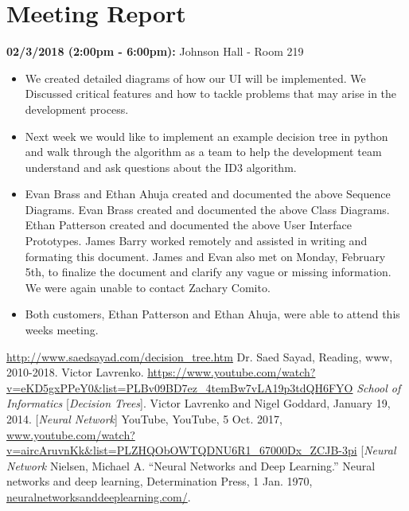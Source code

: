 \documentclass[a4paper]{article}
\begin{document}
\section{Meeting Report}
\textbf{02/3/2018 (2:00pm - 6:00pm):} Johnson Hall - Room 219
\begin{itemize}
\item We created detailed diagrams of how our UI will be implemented. We Discussed critical features and how to tackle problems that may arise in the development process.
\item Next week we would like to implement an example decision tree in python and walk through the algorithm as a team to help the development team understand and ask questions about the ID3 algorithm.
\item Evan Brass and Ethan Ahuja created and documented the above Sequence Diagrams. Evan Brass created and documented the above Class Diagrams. Ethan Patterson created and documented the above User Interface Prototypes. James Barry worked remotely and assisted in writing and formating this document. James and Evan also met on Monday, February 5th, to finalize the document and clarify any vague or missing information. We were again unable to contact Zachary Comito.
\item Both customers, Ethan Patterson and Ethan Ahuja, were able to attend this weeks meeting.
\end{itemize}
\newpage %
\begin{thebibliography}{9}
\url{http://www.saedsayad.com/decision_tree.htm}
Dr. Saed Sayad, Reading, www, 2010-2018.
Victor Lavrenko.
\url{https://www.youtube.com/watch?v=eKD5gxPPeY0&list=PLBv09BD7ez_4temBw7vLA19p3tdQH6FYO}
\textit{School of Informatics} 
[\textit{Decision Trees}]. 
Victor Lavrenko and Nigel Goddard, January 19, 2014.
[\textit{Neural Network}]
YouTube, YouTube, 5 Oct. 2017, \url{www.youtube.com/watch?v=aircAruvnKk&list=PLZHQObOWTQDNU6R1_67000Dx_ZCJB-3pi}
[\textit{Neural Network}
Nielsen, Michael A. “Neural Networks and Deep Learning.” Neural networks and deep learning, Determination Press, 1 Jan. 1970,\url{ neuralnetworksanddeeplearning.com/}.
\end{thebibliography}
\end{document}
